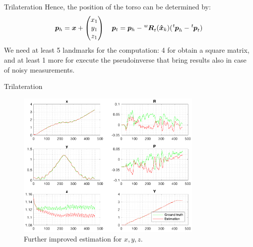 \documentclass[10pt]{beamer}
\begin{document}
    \begin{frame}[fragile]{Trilateration}
        Hence, the position of the torso can be determined by:
        \begin{equation*}
            \bm{p}_h
                =
            \bm{x} +
            \begin{pmatrix}
                x_1 \\
                y_1 \\
                z_1
            \end{pmatrix} \quad
            \bm{p}_t = \bm{p}_h - \tensor[^w]{\bm{R}}{_t}(\bm{\hat{x}}_{k}) (\tensor[^t]{\bm{p}}{_h} - \tensor[^t]{\bm{p}}{_t})
        \end{equation*}
        We need at least 5 landmarks for the computation: 4 for obtain a
        square matrix, and at least 1 more for execute the pseudoinverse that
        bring results also in case of noisy measurements.
    \end{frame}

    \begin{frame}[fragile]{Trilateration}
        \begin{figure}
        \caption{Further improved estimation for $x, y, z$.}
        \vspace{-0.3cm}
        \includegraphics[width=0.8\textwidth]{images/trilateration.png}
        \end{figure}
    \end{frame}
\end{document}
